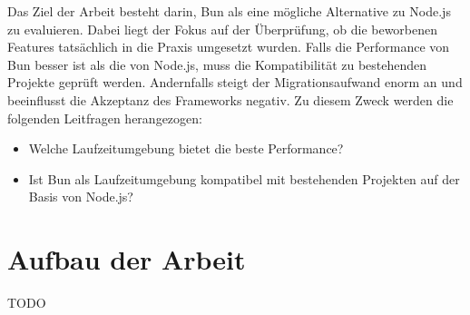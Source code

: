 \noindent
Das Ziel der Arbeit besteht darin, Bun als eine mögliche Alternative zu Node.js zu evaluieren. Dabei liegt der Fokus
auf der Überprüfung, ob die beworbenen Features tatsächlich in die Praxis umgesetzt wurden. Falls die Performance von Bun besser ist als die von Node.js, muss die Kompatibilität zu bestehenden Projekte geprüft werden. Andernfalls steigt der Migrationsaufwand enorm an und beeinflusst die Akzeptanz des Frameworks negativ. Zu diesem Zweck werden die folgenden Leitfragen herangezogen:
\begin{itemize}
    \item Welche Laufzeitumgebung bietet die beste Performance?
    \item Ist Bun als Laufzeitumgebung kompatibel mit bestehenden Projekten auf der Basis von Node.js?
\end{itemize}

\section{Aufbau der Arbeit}
TODO


